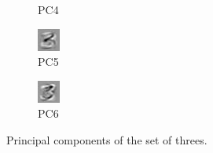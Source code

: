 \documentclass[twocolumn]{article}
\begin{document}
\begin{figure}
\begin{subfigure}[b]{0.1\textwidth}
            \caption{PC4}
            \label{fig:pc4}
    \end{subfigure}
    \begin{subfigure}[b]{0.1\textwidth}
            \centering
            \includegraphics[width=\textwidth]{figs/pc5.jpg}
            \caption{PC5}
            \label{fig:pc5}
    \end{subfigure}
    \begin{subfigure}[b]{0.1\textwidth}
            \centering
            \includegraphics[width=\textwidth]{figs/pc6.jpg}
            \caption{PC6}
            \label{fig:pc6}
    \end{subfigure}
    \label{fig:pcs}
    \caption{Principal components of the set of threes.}
\end{figure}
\end{document}
